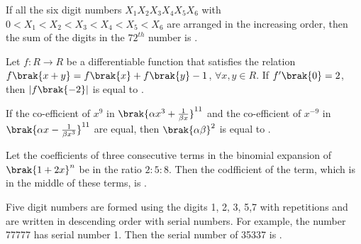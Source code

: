 \item If all the six digit numbers $X_{1}X_{2}X_{3}X_{4}X_{5}X_{6}$ with $0<X_{1}<X_{2}<X_{3}<X_{4}<X_{5}<X_{6}$ are arranged in the increasing order, then the sum of the digits in the $72^{th}$ number is \underline{\hspace{2.5cm}}. \hfill{}

\item Let $f\colon R \to R$ be a differentiable function that satisfies the relation $f\brak{x+y}=f\brak{x}+f\brak{y}-1$, $\forall{x},y\in R$. If $f^{\prime}\brak{0}=2$, then $\lvert f\brak{-2}\rvert$ is equal to \underline{\hspace{2.5cm}}. \hfill{}

\item If the co-efficient of $x^{9}$ in $\brak{\alpha x^{3}+\frac{1}{\beta x}}^{11}$ and the co-efficient of $x^{-9}$ in $\brak{\alpha x-\frac{1}{\beta x^{3}}}^{11}$ are equal, then $\brak{\alpha\beta}^{2}$ is equal to \underline{\hspace{2.5cm}}. \hfill{}

\item Let the coefficients of three consecutive terms in the binomial expansion of $\brak{1+2x}^{n}$ be in the ratio $2\colon5\colon8$. Then the codfficient of the term, which  is in the middle of these terms, is \underline{\hspace{2.5cm}}. \hfill{}

\item Five digit numbers are formed using the digits 1, 2, 3, 5,7 with repetitions and are written in descending order with serial numbers. For example, the number 77777 has serial number 1. Then the serial number of 35337 is \underline{\hspace{2.5cm}}. \hfill{}

